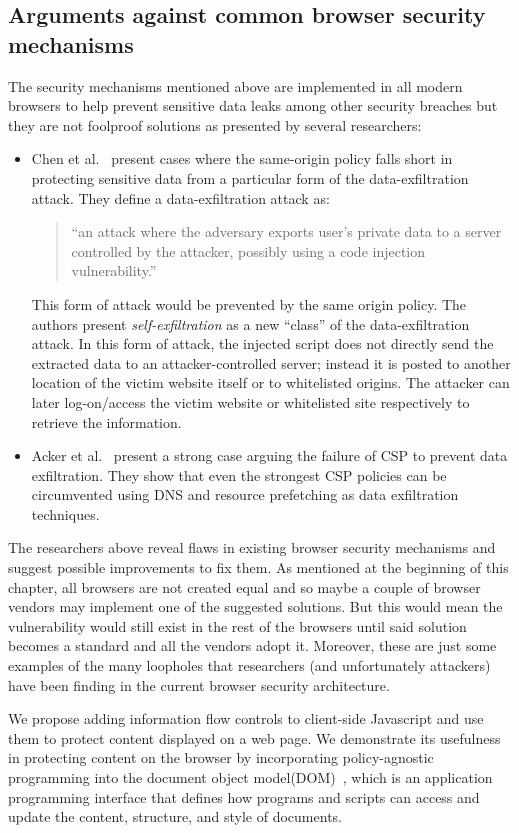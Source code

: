 \subsection{Arguments against common browser security mechanisms \label{sec:against}}
The security mechanisms mentioned above are implemented in all modern browsers to
help prevent sensitive data leaks among other security breaches but they are not
foolproof solutions as presented by several researchers:
\begin{itemize}
  \item Chen et al.~\cite{SelfExfil} present cases where the same-origin policy falls short
  in protecting sensitive data from a particular form of the data-exfiltration attack.
  They define a data-exfiltration attack as:

  \begin{quotation}
    ``an attack where the adversary exports user's private data to a server controlled
    by the attacker, possibly using a code injection vulnerability.''
  \end{quotation}
  This form of attack would be prevented by the same origin policy. The authors present
  \textit{self-exfiltration} as a new ``class'' of the data-exfiltration attack. In
  this form of attack, the injected script does not directly send the extracted data
  to an attacker-controlled server; instead it is posted to another location
  of the victim website itself or to whitelisted origins. The attacker can later
  log-on/access the victim website or whitelisted site respectively to retrieve the
  information.

  \item Acker et al.~\cite{DataExfilCSP} present a strong case arguing the failure of
  CSP to prevent data exfiltration. They show that even the strongest CSP policies
  can be circumvented using DNS and resource prefetching as data exfiltration
  techniques.
\end{itemize}
The researchers above reveal flaws in existing browser security mechanisms and suggest
possible improvements to fix them. As mentioned at the beginning of this chapter,
all browsers are not created equal and so maybe a couple of browser vendors may
implement one of the suggested solutions. But this would mean the vulnerability
would still exist in the rest of the browsers until said solution becomes a
standard and all the vendors adopt it. Moreover, these are just some examples of
the many loopholes that researchers (and unfortunately attackers) have been finding
in the current browser security architecture.

We propose adding information flow controls to client-side Javascript and use them
to protect content displayed on a web page. We demonstrate its usefulness in
protecting content on the browser by incorporating policy-agnostic programming into
the document object model(DOM)~\cite{DOM}, which is an application programming
interface that defines how programs and scripts can access and update the content,
structure, and style of documents.

